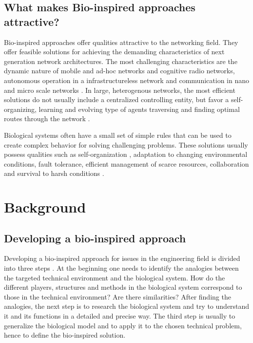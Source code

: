 \documentclass{IWORK2014}
\begin{document}
\subsection{What makes Bio-inspired approaches attractive?} 
Bio-inspired approaches offer qualities attractive to the networking field. They offer feasible solutions for achieving the demanding characteristics of next generation network architectures. The most challenging characteristics are the dynamic nature of mobile and ad-hoc networks and cognitive radio networks, autonomous operation in a infrastructureless network and communication in nano and micro scale networks \cite{dressler2010bio}. In large, heterogenous networks, the most efficient solutions do not usually include a centralized controlling entity, but favor a self-organizing, learning and evolving type of agents traversing and finding optimal routes through the network \cite{dressler2010bio}.

Biological systems often have a small set of simple rules that can be used to create complex behavior \cite{dressler2010bio} for solving challenging problems. These solutions usually possess qualities such as self-organization \cite{kroeker2011biology}, adaptation to changing environmental conditions, fault tolerance, efficient management of scarce resources, collaboration and survival to harsh conditions \cite{dressler2010bio}.

\section{Background}

\subsection{Developing a bio-inspired approach}
Developing a bio-inspired approach for issues in the engineering field is divided into three steps \cite{dressler2010bio}. At the beginning one needs to identify the analogies between the targeted technical environment and the biological system. How do the different players, structures and methods in the biological system correspond to those in the technical environment? Are there similarities? After finding the analogies, the next step is to research the biological system and try to understand it and its functions in a detailed and precise way. The third step is usually to generalize the biological model and to apply it to the chosen technical problem, hence to define the bio-inspired solution.
\end{document}
